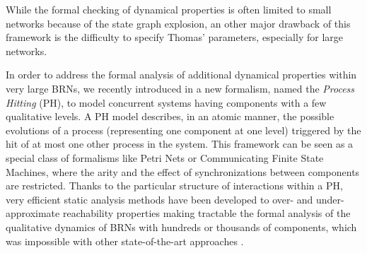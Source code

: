 While the formal checking of dynamical properties is often limited to small networks because of the
state graph explosion, an other major drawback of this framework is the difficulty to
specify Thomas' parameters, especially for large networks.    

In order to address the formal analysis of additional dynamical properties  within very large BRNs, we recently
introduced in \cite{PMR10-TCSB} a new formalism, named the \emph{Process Hitting} (PH), to model
concurrent systems having components with a few qualitative levels.
A PH model describes, in an atomic manner, the possible evolutions of a process (representing one
component at one level) triggered by the hit of at most one other process in the system.
This framework can be seen as a special class of formalisms like Petri Nets or Communicating Finite
State Machines, where the arity and the effect of synchronizations between components are
restricted.
Thanks to the particular structure of interactions within a PH, very efficient static analysis
methods have been developed to over- and under-approximate reachability properties making tractable
the formal analysis of the qualitative dynamics of BRNs with hundreds or thousands of components,
which was impossible with other state-of-the-art approaches \cite{PMR12-MSCS,PAK13-CAV,FPMR13-CS2Bio}.
 
